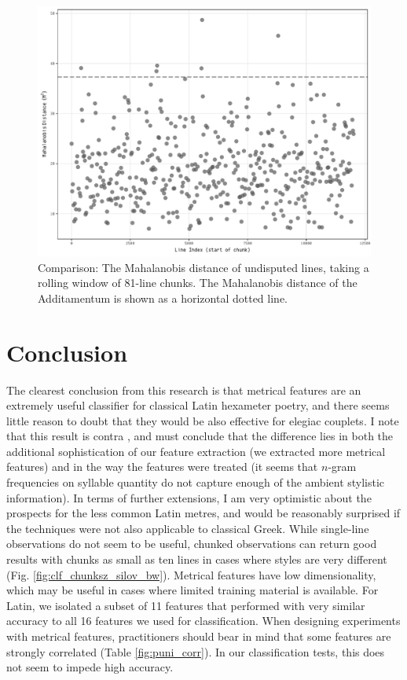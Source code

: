 \documentclass[11pt,a4paper]{scrartcl} %
\begin{document}
{\begin{figure}[h]
    \caption{Comparison: The Mahalanobis distance of undisputed lines, taking a rolling window of 81-line chunks. The Mahalanobis distance of the Additamentum is shown as a horizontal dotted line.}
    \label{fig:rolling_weirdness}
    \includegraphics[width=\textwidth]{rolling_weirdness_bw.pdf}
\end{figure}

\section{Conclusion}
The clearest conclusion from this research is that metrical features are an extremely useful classifier for classical Latin hexameter poetry, and there seems little reason to doubt that they would be also effective for elegiac couplets. I note that this result is contra \citet[293]{forstall_evidence_2011}, and must conclude that the difference lies in both the additional sophistication of our feature extraction (we extracted more metrical features) and in the way the features were treated (it seems that $n$-gram frequencies on syllable quantity do not capture enough of the ambient stylistic information). In terms of further extensions, I am very optimistic about the prospects for the less common Latin metres, and would be reasonably surprised if the techniques were not also applicable to classical Greek. While single-line observations do not seem to be useful, chunked observations can return good results with chunks as small as ten lines in cases where styles are very different (Fig. \ref{fig:clf_chunksz_silov_bw}). Metrical features have low dimensionality, which may be useful in cases where limited training material is available. For Latin, we isolated a subset of 11 features that performed with very similar accuracy to all 16 features we used for classification. When designing experiments with metrical features, practitioners should bear in mind that some features are strongly correlated (Table \ref{fig:puni_corr}). In our classification tests, this does not seem to impede high accuracy.

}
\end{document}
